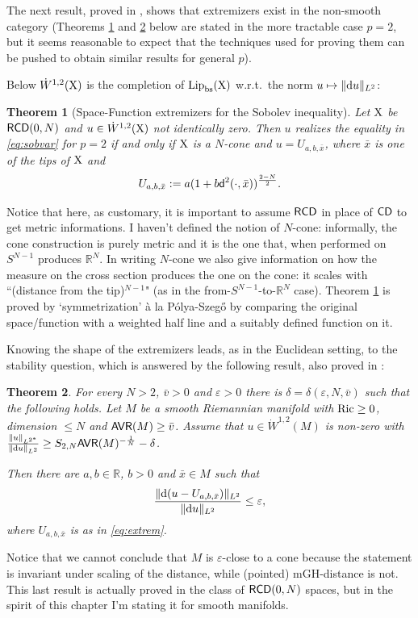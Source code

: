 \documentclass[11pt]{article}
\numberwithin{equation}{section}
\newtheorem{theorem}{Theorem}[section]
\newcommand{\R}{\mathbb{R}}
\newcommand{\X}{{\rm X}}
\newcommand{\sfd}{{\sf d}}
\newcommand{\CD}{{\sf CD}}
\newcommand{\RCD}{{\sf RCD}}
\renewcommand{\d}{{\rm d}}
\newcommand{\Lip}{{\rm Lip}}
\newcommand{\bs}{{\rm bs}}
\newcommand{\eps}{\varepsilon}
\newcommand{\AVR}{{\sf AVR}}
\begin{document}
The next result, proved in \cite{NobiliViolo22}, shows that extremizers exist in the non-smooth category (Theorems \ref{thm:extrsobman} and \ref{thm:qualstabsob} below are stated in the more tractable case $p=2$, but it seems reasonable to expect that the techniques used for proving them can be pushed to obtain similar results for general $p$). 

Below $\dot W^{1,2}(\X)$ is the completion of $\Lip_\bs(\X)$ w.r.t.\ the norm $u\mapsto\|\d u\|_{L^2}$:
\begin{theorem}[Space-Function extremizers for the Sobolev inequality]\label{thm:extrsobman}
Let $\X$ be $\RCD(0,N)$ and $u\in\dot W^{1,2}(\X)$ not identically zero. Then $u$ realizes the equality in \eqref{eq:sobvar} for $p=2$ if and only if $\X$ is a $N$-cone and $u=U_{a,b,\bar x}$, where $\bar x$ is  one of the tips of $\X$ and
\begin{equation}
\label{eq:extrem}
U_{a,b,\bar x}:=a(1+b\sfd^2(\cdot,\bar x))^{\frac{2-N}2}.
\end{equation}
\end{theorem}
Notice that here, as customary, it is important to assume $\RCD$ in place of $\CD$ to get metric informations. I haven't defined the notion of $N$-cone: informally, the cone construction is purely metric and it is the one that, when performed on $S^{N-1}$ produces $\R^N$. In writing $N$-cone we also give information on how the measure on the cross section produces the one on the cone: it scales with ``(distance from the tip)$^{N-1}$" (as in the from-$S^{N-1}$-to-$\R^N$ case). Theorem \ref{thm:extrsobman} is proved by `symmetrization' \`a la P\'olya-Szeg\H{o} by comparing the original space/function with a weighted half line and a suitably defined function on it. 

Knowing the shape of the extremizers leads, as in the Euclidean setting, to the stability question, which is answered by the following result, also proved in \cite{NobiliViolo22}:
\begin{theorem}\label{thm:qualstabsob}
For every $N>2$, $\bar v>0$ and $\eps>0$ there is $\delta=\delta(\eps,N,\bar v)$ such that the following holds. Let $M$ be a smooth Riemannian manifold with ${\rm Ric}\geq0$, dimension $\leq N$ and $\AVR(M)\geq\bar v$. Assume that $u\in\dot W^{1,2}(M)$ is non-zero with $\frac{\|u\|_{L^{2^*}}}{\|\d u\|_{L^2}}\geq S_{2,N}\AVR(M)^{-\frac1N}-\delta$. 

Then there are $a,b\in\R$, $b>0$ and $\bar x\in M$ such that 
\[
\frac{\|\d(u-U_{a,b,\bar x})\|_{L^2}}{\|\d u\|_{L^2}}\leq \eps,
\]
where $U_{a,b,\bar x}$ is as in \eqref{eq:extrem}.
\end{theorem}
Notice that we cannot conclude that $M$ is $\eps$-close to a cone because the statement is invariant under scaling of the distance, while (pointed) mGH-distance is not. This last result is actually proved in the class of $\RCD(0,N)$ spaces, but in the spirit of this chapter I'm stating it for smooth manifolds.
\end{document}
